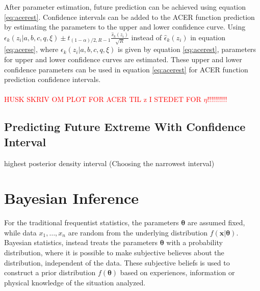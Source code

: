 After parameter estimation, future prediction can be achieved using equation \eqref{eq:acerest}. Confidence intervals can be added to the ACER function prediction by estimating the parameters to the upper and lower confidence curve. Using $\epsilon_{k}(z_i|a,b,c,q,\xi) \pm t_{(1-\alpha)/2,R-1} \frac{\hat{s}_k(z_i)}{\sqrt{R}}$ instead of $\hat{\epsilon}_k(z_i)$ in equation \eqref{eq:acerse}, where $\epsilon_{k}(z_i|a,b,c,q,\xi)$ is given by equation \eqref{eq:acerest}, parameters for upper and lower confidence curves are estimated. These upper and lower confidence parameters can be used in equation \eqref{eq:acerest} for ACER function prediction confidence intervals.
\\ \\
\textcolor{red}{HUSK SKRIV OM PLOT FOR ACER TIL z I STEDET FOR $\eta$!!!!!!!!!!}

\subsection{Predicting Future Extreme With Confidence Interval}
highest posterior density interval (Choosing the narrowest interval)


\section{Bayesian Inference}
\label{ch:BayesianInference}
For the traditional frequentist statistics, the parameters $\boldsymbol{\theta}$ are assumed fixed, while data $x_1,\dotsc ,x_n$ are random from the underlying distribution $f(\boldsymbol{x}| \boldsymbol{\theta})$. Bayesian statistics, instead treats the parameters $\boldsymbol{\theta}$ with a probability distribution, where it is possible to make subjective believes about the distribution, independent of the data. These subjective beliefs is used to construct a prior distribution $f(\boldsymbol{\theta})$ based on experiences, information or physical knowledge of the situation analyzed. 

